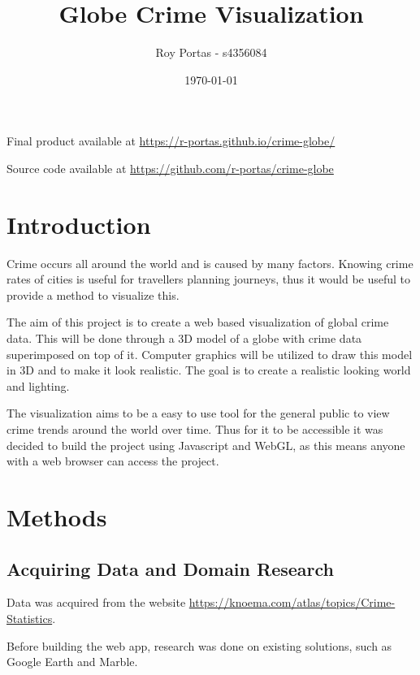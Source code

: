 \documentclass[]{article}
\begin{document}
\title{Globe Crime Visualization}
\author{Roy Portas - s4356084}
\date{\today}
\maketitle 

\begin{large}
    \begin{center}
        Final product available at \url{https://r-portas.github.io/crime-globe/}

        Source code available at \url{https://github.com/r-portas/crime-globe}
    \end{center}
\end{large}

\break

\section{Introduction}

Crime occurs all around the world and is caused by many factors.
Knowing crime rates of cities is useful for travellers planning journeys, thus it would be useful to provide a
method to visualize this.

The aim of this project is to create a web based visualization of global crime data.
This will be done through a 3D model of a globe with crime data superimposed on top of it.
Computer graphics will be utilized to draw this model in 3D and to make it look realistic.
The goal is to create a realistic looking world and lighting.

The visualization aims to be a easy to use tool for the general public to view crime trends around the world over time.
Thus for it to be accessible it was decided to build the project using Javascript and WebGL,
as this means anyone with a web browser can access the project.

\section{Methods}

\subsection{Acquiring Data and Domain Research}

Data was acquired from the website \url{https://knoema.com/atlas/topics/Crime-Statistics}.

Before building the web app, research was done on existing solutions, such as Google Earth and Marble.
\end{document}
